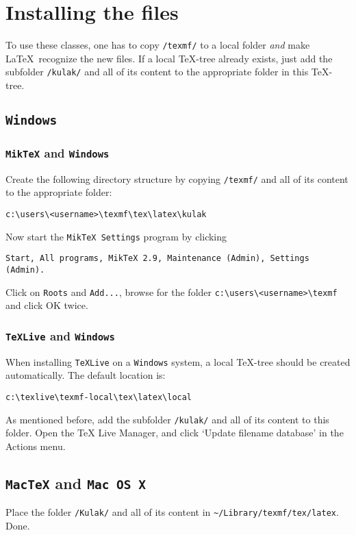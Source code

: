 \documentclass[a4paper,kulak]{kulakarticle} %
\begin{document}
\section{Installing the files}
\label{sec:install}

To use these classes, one has to copy \texttt{/texmf/} to a local folder \emph{and} make \LaTeX\ recognize the new files. If a local \TeX-tree already exists, just add the subfolder \texttt{/kulak/} and all of its content to the appropriate folder in this \TeX-tree.

\subsection{\texttt{Windows}}

\subsubsection{\texttt{MikTeX} and \texttt{Windows}}

Create the following directory structure by copying \texttt{/texmf/} and all of its content to the appropriate folder:
\begin{verbatim}
c:\users\<username>\texmf\tex\latex\kulak
\end{verbatim}
Now start the \texttt{MikTeX Settings} program by clicking 
\begin{verbatim}
Start, All programs, MikTeX 2.9, Maintenance (Admin), Settings (Admin).
\end{verbatim}
Click on \texttt{Roots} and \texttt{Add...}, browse for the folder \verb+c:\users\<username>\texmf+ and click OK twice.

\subsubsection{\texttt{TeXLive} and \texttt{Windows}}

When installing \texttt{TeXLive} on a \texttt{Windows} system, a local \TeX-tree should be created automatically. The default location is:
\begin{verbatim}
c:\texlive\texmf-local\tex\latex\local
\end{verbatim}
As mentioned before, add the subfolder \texttt{/kulak/} and all of its content to this folder. Open the TeX Live Manager, and click `Update filename database' in the Actions menu.


\subsection{\texttt{MacTeX} and \texttt{Mac OS X}}
Place the folder \texttt{/Kulak/} and all of its content in \verb+~/Library/texmf/tex/latex+. Done.
\end{document}
